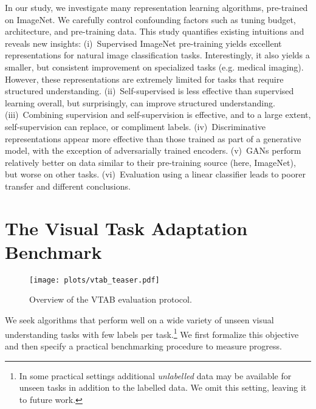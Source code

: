 \documentclass{article}
\newcommand{\imagenet}{ImageNet}
\begin{document}
In our study, we investigate many representation learning algorithms, pre-trained on \imagenet{}.
We carefully control confounding factors such as tuning budget, architecture, and pre-training data.
This study quantifies existing intuitions and reveals new insights:
(i)~Supervised \imagenet{} pre-training yields excellent representations for natural image classification tasks.
Interestingly, it also yields a smaller, but consistent improvement on specialized tasks (e.g. medical imaging).
However, these representations are extremely limited for tasks that require structured understanding.
(ii)~Self-supervised is less effective than supervised learning overall, but surprisingly, can improve structured understanding.
(iii)~Combining supervision and self-supervision is effective, and to a large extent, self-supervision can replace, or compliment labels.
(iv)~Discriminative representations appear more effective than those trained as part of a generative model, with the exception of adversarially trained encoders.
(v)~GANs perform relatively better on data similar to their pre-training source (here, \imagenet{}), but worse on other tasks.
(vi)~Evaluation using a linear classifier leads to poorer transfer and different conclusions.



\section{The Visual Task Adaptation Benchmark}

\begin{figure}[h]
\centering
\texttt{[image: plots/vtab\_teaser.pdf]}
\caption{Overview of the VTAB evaluation protocol.}
\label{fig:vtab_protocol}
\end{figure}

We seek algorithms that perform well on a wide variety of unseen visual understanding tasks with few labels per task.\footnote{
In some practical settings additional \emph{unlabelled} data may be available for unseen tasks in addition to the labelled data.
We omit this setting, leaving it to future work.}
We first formalize this objective and then specify a practical benchmarking procedure to measure progress.
\end{document}
